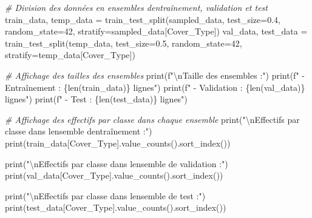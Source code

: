 \documentclass[
  letterpaper,
  DIV=11,
  numbers=noendperiod]{scrartcl}
\newenvironment{Shaded}{}{}
\newcommand{\BuiltInTok}[1]{\textcolor[rgb]{0.00,0.50,0.00}{#1}}
\newcommand{\CharTok}[1]{\textcolor[rgb]{0.25,0.44,0.63}{#1}}
\newcommand{\CommentTok}[1]{\textcolor[rgb]{0.38,0.63,0.69}{\textit{#1}}}
\newcommand{\DecValTok}[1]{\textcolor[rgb]{0.25,0.63,0.44}{#1}}
\newcommand{\FloatTok}[1]{\textcolor[rgb]{0.25,0.63,0.44}{#1}}
\newcommand{\NormalTok}[1]{#1}
\newcommand{\OperatorTok}[1]{\textcolor[rgb]{0.40,0.40,0.40}{#1}}
\newcommand{\SpecialCharTok}[1]{\textcolor[rgb]{0.25,0.44,0.63}{#1}}
\newcommand{\SpecialStringTok}[1]{\textcolor[rgb]{0.73,0.40,0.53}{#1}}
\newcommand{\StringTok}[1]{\textcolor[rgb]{0.25,0.44,0.63}{#1}}
\begin{document}
\begin{Shaded}
\begin{Highlighting}[]
\CommentTok{\# Division des données en ensembles d\textquotesingle{}entraînement, validation et test}
\NormalTok{train\_data, temp\_data }\OperatorTok{=}\NormalTok{ train\_test\_split(sampled\_data, test\_size}\OperatorTok{=}\FloatTok{0.4}\NormalTok{, random\_state}\OperatorTok{=}\DecValTok{42}\NormalTok{, stratify}\OperatorTok{=}\NormalTok{sampled\_data[}\StringTok{\textquotesingle{}Cover\_Type\textquotesingle{}}\NormalTok{])}
\NormalTok{val\_data, test\_data }\OperatorTok{=}\NormalTok{ train\_test\_split(temp\_data, test\_size}\OperatorTok{=}\FloatTok{0.5}\NormalTok{, random\_state}\OperatorTok{=}\DecValTok{42}\NormalTok{, stratify}\OperatorTok{=}\NormalTok{temp\_data[}\StringTok{\textquotesingle{}Cover\_Type\textquotesingle{}}\NormalTok{])}

\CommentTok{\# Affichage des tailles des ensembles}
\BuiltInTok{print}\NormalTok{(}\SpecialStringTok{f"}\CharTok{\textbackslash{}n}\SpecialStringTok{Taille des ensembles :"}\NormalTok{)}
\BuiltInTok{print}\NormalTok{(}\SpecialStringTok{f"  {-} Entraînement : }\SpecialCharTok{\{}\BuiltInTok{len}\NormalTok{(train\_data)}\SpecialCharTok{\}}\SpecialStringTok{ lignes"}\NormalTok{)}
\BuiltInTok{print}\NormalTok{(}\SpecialStringTok{f"  {-} Validation : }\SpecialCharTok{\{}\BuiltInTok{len}\NormalTok{(val\_data)}\SpecialCharTok{\}}\SpecialStringTok{ lignes"}\NormalTok{)}
\BuiltInTok{print}\NormalTok{(}\SpecialStringTok{f"  {-} Test : }\SpecialCharTok{\{}\BuiltInTok{len}\NormalTok{(test\_data)}\SpecialCharTok{\}}\SpecialStringTok{ lignes"}\NormalTok{)}

\CommentTok{\# Affichage des effectifs par classe dans chaque ensemble}
\BuiltInTok{print}\NormalTok{(}\StringTok{"}\CharTok{\textbackslash{}n}\StringTok{Effectifs par classe dans l\textquotesingle{}ensemble d\textquotesingle{}entraînement :"}\NormalTok{)}
\BuiltInTok{print}\NormalTok{(train\_data[}\StringTok{\textquotesingle{}Cover\_Type\textquotesingle{}}\NormalTok{].value\_counts().sort\_index())}

\BuiltInTok{print}\NormalTok{(}\StringTok{"}\CharTok{\textbackslash{}n}\StringTok{Effectifs par classe dans l\textquotesingle{}ensemble de validation :"}\NormalTok{)}
\BuiltInTok{print}\NormalTok{(val\_data[}\StringTok{\textquotesingle{}Cover\_Type\textquotesingle{}}\NormalTok{].value\_counts().sort\_index())}

\BuiltInTok{print}\NormalTok{(}\StringTok{"}\CharTok{\textbackslash{}n}\StringTok{Effectifs par classe dans l\textquotesingle{}ensemble de test :"}\NormalTok{)}
\BuiltInTok{print}\NormalTok{(test\_data[}\StringTok{\textquotesingle{}Cover\_Type\textquotesingle{}}\NormalTok{].value\_counts().sort\_index())}


\end{Highlighting}
\end{Shaded}
\end{document}
